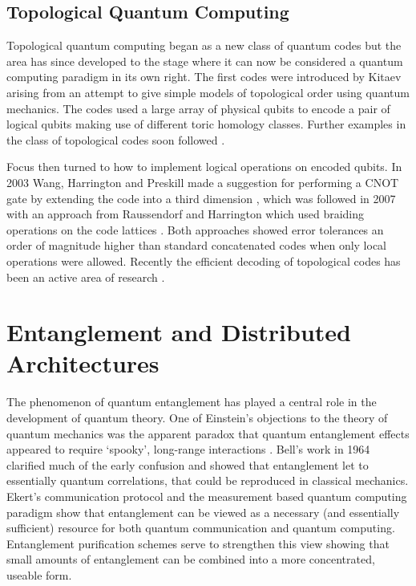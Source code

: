 \subsection{Topological Quantum Computing}

Topological quantum computing began as a new class of quantum codes but the area has since developed to the stage where it can now be considered a quantum computing paradigm in its own right. The first codes were introduced by Kitaev \cite{kitaev_1, kitaev_2} arising from an attempt to give simple models of topological order using quantum mechanics. The codes used a large array of physical qubits to encode a pair of logical qubits making use of different toric homology classes. Further examples in the class of topological codes soon followed \cite{kitaev_brayvi, planar_codes_freedman_meyer}.

Focus then turned to how to implement logical operations on encoded qubits. In 2003 Wang, Harrington and Preskill made a suggestion for performing a CNOT gate by extending the code into a third dimension \cite{planar_cnot_preskill}, which was followed in 2007 with an approach from Raussendorf and Harrington which used braiding operations on the code lattices \cite{raussendorf07, raussendorf07_2}. Both approaches showed error tolerances an order of magnitude higher than standard concatenated codes when only local operations were allowed. Recently the efficient decoding of topological codes has been an active area of research \cite{fowler_matching_12, poulin_renormalisation, poulin_renormalisation2, wooton_mcmc1}.

\section{Entanglement and Distributed Architectures}

The phenomenon of quantum entanglement has played a central role in the development of quantum theory. One of Einstein's objections to the theory of quantum mechanics was the apparent paradox that quantum entanglement effects appeared to require `spooky', long-range interactions \cite{epr}. Bell's work in 1964 \cite{bells_theorem} clarified much of the early confusion and showed that entanglement let to essentially quantum correlations, that could be reproduced in classical mechanics. Ekert's communication protocol \cite{ekert_91} and the measurement based quantum computing paradigm \cite{one_way_qc} show that entanglement can be viewed as a necessary (and essentially sufficient) resource for both quantum communication and quantum computing. Entanglement purification schemes \cite{purification} serve to strengthen this view showing that small amounts of entanglement can be combined into a more concentrated, useable form.

